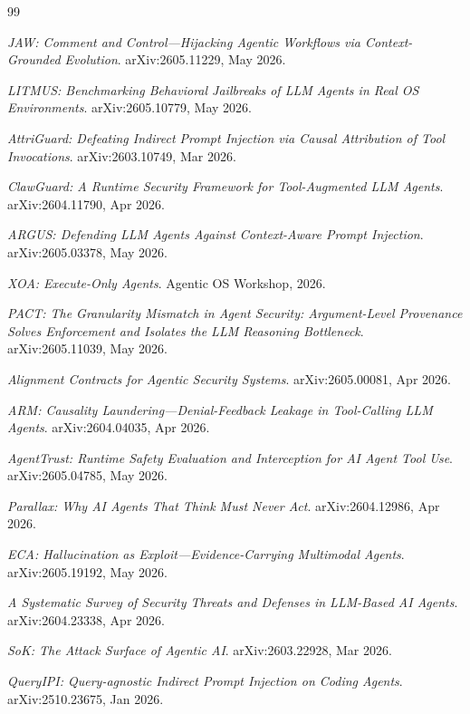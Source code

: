 \documentclass{article}
\begin{document}

\begin{thebibliography}{99}

\textit{JAW: Comment and Control---Hijacking Agentic Workflows via Context-Grounded Evolution}. arXiv:2605.11229, May 2026.

\textit{LITMUS: Benchmarking Behavioral Jailbreaks of LLM Agents in Real OS Environments}. arXiv:2605.10779, May 2026.

\textit{AttriGuard: Defeating Indirect Prompt Injection via Causal Attribution of Tool Invocations}. arXiv:2603.10749, Mar 2026.

\textit{ClawGuard: A Runtime Security Framework for Tool-Augmented LLM Agents}. arXiv:2604.11790, Apr 2026.

\textit{ARGUS: Defending LLM Agents Against Context-Aware Prompt Injection}. arXiv:2605.03378, May 2026.

\textit{XOA: Execute-Only Agents}. Agentic OS Workshop, 2026.

\textit{PACT: The Granularity Mismatch in Agent Security: Argument-Level Provenance Solves Enforcement and Isolates the LLM Reasoning Bottleneck}. arXiv:2605.11039, May 2026.

\textit{Alignment Contracts for Agentic Security Systems}. arXiv:2605.00081, Apr 2026.

\textit{ARM: Causality Laundering---Denial-Feedback Leakage in Tool-Calling LLM Agents}. arXiv:2604.04035, Apr 2026.

\textit{AgentTrust: Runtime Safety Evaluation and Interception for AI Agent Tool Use}. arXiv:2605.04785, May 2026.

\textit{Parallax: Why AI Agents That Think Must Never Act}. arXiv:2604.12986, Apr 2026.

\textit{ECA: Hallucination as Exploit---Evidence-Carrying Multimodal Agents}. arXiv:2605.19192, May 2026.

\textit{A Systematic Survey of Security Threats and Defenses in LLM-Based AI Agents}. arXiv:2604.23338, Apr 2026.

\textit{SoK: The Attack Surface of Agentic AI}. arXiv:2603.22928, Mar 2026.

\textit{QueryIPI: Query-agnostic Indirect Prompt Injection on Coding Agents}. arXiv:2510.23675, Jan 2026.


\end{thebibliography}
\end{document}
